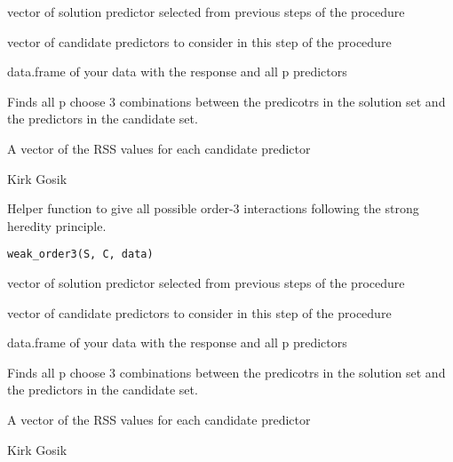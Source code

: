 \documentclass[letterpaper]{book}
\begin{document}
%
\begin{Arguments}
\begin{ldescription}
\item[\code{S}] vector of solution predictor selected from previous steps of the procedure

\item[\code{C}] vector of candidate predictors to consider in this step of the procedure

\item[\code{data}] data.frame of your data with the response and all p predictors
\end{ldescription}
\end{Arguments}
%
\begin{Details}\relax
Finds all p choose 3 combinations between the predicotrs in the solution set and the
predictors in the candidate set.
\end{Details}
%
\begin{Value}
A vector of the RSS values for each candidate predictor
\end{Value}
%
\begin{Author}\relax
Kirk Gosik
\end{Author}
%
\begin{Description}\relax
Helper function to give all possible order-3 interactions following the strong
heredity principle.
\end{Description}
%
\begin{Usage}
\begin{verbatim}
weak_order3(S, C, data)
\end{verbatim}
\end{Usage}
%
\begin{Arguments}
\begin{ldescription}
\item[\code{S}] vector of solution predictor selected from previous steps of the procedure

\item[\code{C}] vector of candidate predictors to consider in this step of the procedure

\item[\code{data}] data.frame of your data with the response and all p predictors
\end{ldescription}
\end{Arguments}
%
\begin{Details}\relax
Finds all p choose 3 combinations between the predicotrs in the solution set and the
predictors in the candidate set.
\end{Details}
%
\begin{Value}
A vector of the RSS values for each candidate predictor
\end{Value}
%
\begin{Author}\relax
Kirk Gosik
\end{Author}
\printindex{}
\end{document}
